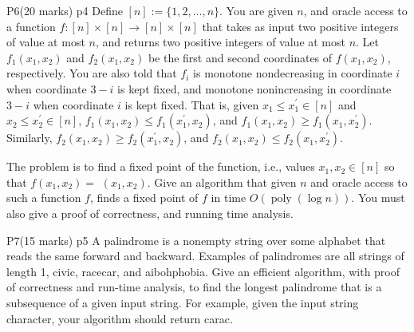 \documentclass[a4paper, 11pt]{article}
\begin{document}

\begin{problem}{%
		P6\hfill  (20 marks)
	}{p4%
	}
	Define $[n]:=\{1,2, \ldots, n\}$. You are given $n$, and oracle access to a function $f:[n] \times[n] \rightarrow[n] \times[n]$ that takes as input two positive integers of value at most $n$, and returns two positive integers of value at most $n$. Let $f_1\left(x_1, x_2\right)$ and $f_2\left(x_1, x_2\right)$ be the first and second coordinates of $f\left(x_1, x_2\right)$, respectively. You are also told that $f_i$ is monotone nondecreasing in coordinate $i$ when coordinate $3-i$ is kept fixed, and monotone nonincreasing in coordinate $3-i$ when coordinate $i$ is kept fixed. That is, given $x_1 \leq x_1^{\prime} \in[n]$ and $x_2 \leq x_2^{\prime} \in[n]$, $f_1\left(x_1, x_2\right) \leq f_1\left(x_1^{\prime}, x_2\right)$, and $f_1\left(x_1, x_2\right) \geq f_1\left(x_1, x_2^{\prime}\right)$. Similarly, $f_2\left(x_1, x_2\right) \geq f_2\left(x_1^{\prime}, x_2\right)$, and $f_2\left(x_1, x_2\right) \leq f_2\left(x_1, x_2^{\prime}\right)$.\parinn
	
	The problem is to find a fixed point of the function, i.e., values $x_1, x_2 \in[n]$ so that $f\left(x_1, x_2\right)=$ $\left(x_1, x_2\right)$. Give an algorithm that given $n$ and oracle access to such a function $f$, finds a fixed point of $f$ in time $O(\operatorname{poly}(\log n))$. You must also give a proof of correctness, and running time analysis.
\end{problem}
\solve{
	
}

\begin{problem}{%
	P7\hfill  (15 marks)
}{p5%
}
A palindrome is a nonempty string over some alphabet that reads the same forward and backward. Examples of palindromes are all strings of length 1, civic, racecar, and aibohphobia. Give an efficient algorithm, with proof of correctness and run-time analysis, to find the longest palindrome that is a subsequence of a given input string. For example, given the input string character, your algorithm should return carac.
\end{problem}
\solve{

}
\end{document}

